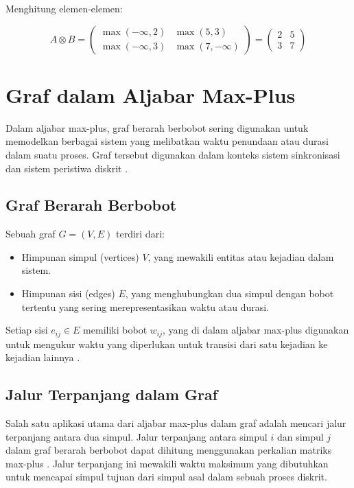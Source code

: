 \documentclass{file/TA-ITS}
\theoremstyle{definition}
\theoremstyle{definition}
\theoremstyle{plain}
\begin{document}
Menghitung elemen-elemen:

\[
A \otimes B = \begin{pmatrix} \max(-\infty, 2) & \max(5, 3) \\ \max(-\infty, 3) & \max(7, -\infty) \end{pmatrix}
= \begin{pmatrix} 2 & 5 \\ 3 & 7 \end{pmatrix}
\]

\section{Graf dalam Aljabar Max-Plus}

Dalam aljabar max-plus, graf berarah berbobot sering digunakan untuk memodelkan berbagai sistem yang melibatkan waktu penundaan atau durasi dalam suatu proses. Graf tersebut digunakan dalam konteks sistem sinkronisasi dan sistem peristiwa diskrit \cite{heidergott}.

\subsection{Graf Berarah Berbobot}

Sebuah graf \( G = (V, E) \) terdiri dari:
\begin{itemize}
    \item Himpunan simpul (vertices) \( V \), yang mewakili entitas atau kejadian dalam sistem.
    \item Himpunan sisi (edges) \( E \), yang menghubungkan dua simpul dengan bobot tertentu yang sering merepresentasikan waktu atau durasi.
\end{itemize}

Setiap sisi \( e_{ij} \in E \) memiliki bobot \( w_{ij} \), yang di dalam aljabar max-plus digunakan untuk mengukur waktu yang diperlukan untuk transisi dari satu kejadian ke kejadian lainnya \cite{baccelli}.

\subsection{Jalur Terpanjang dalam Graf}

Salah satu aplikasi utama dari aljabar max-plus dalam graf adalah mencari jalur terpanjang antara dua simpul. Jalur terpanjang antara simpul \( i \) dan simpul \( j \) dalam graf berarah berbobot dapat dihitung menggunakan perkalian matriks max-plus \cite{heidergott}. Jalur terpanjang ini mewakili waktu maksimum yang dibutuhkan untuk mencapai simpul tujuan dari simpul asal dalam sebuah proses diskrit.
\end{document}
